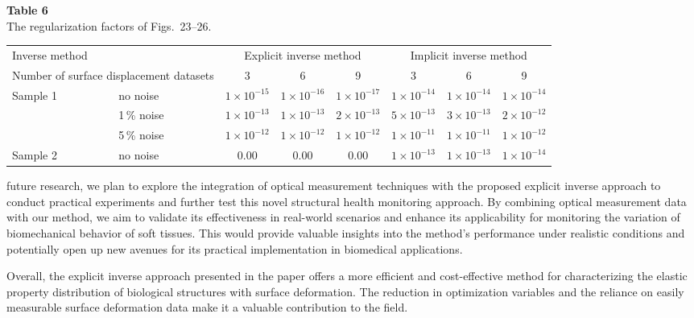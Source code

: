 \documentclass[11pt]{article}
\begin{document}
\noindent\textbf{Table 6}\\[0.2em]
{\small The regularization factors of Figs.~23--26.}
\vspace{0.3em}

\begin{center}
\footnotesize
\begin{tabular}{@{}ll ccc ccc@{}}
\toprule
\multicolumn{2}{l}{Inverse method}
  & \multicolumn{3}{c}{Explicit inverse method}
  & \multicolumn{3}{c}{Implicit inverse method} \\
\cmidrule(lr){3-5}\cmidrule(lr){6-8}
\multicolumn{2}{l}{Number of surface displacement datasets}
  & 3 & 6 & 9 & 3 & 6 & 9 \\
\midrule
\multirow{3}{*}{Sample 1}
  & no noise    & $1\times 10^{-15}$ & $1\times 10^{-16}$ & $1\times 10^{-17}$ & $1\times 10^{-14}$ & $1\times 10^{-14}$ & $1\times 10^{-14}$ \\
  & 1\,\% noise & $1\times 10^{-13}$ & $1\times 10^{-13}$ & $2\times 10^{-13}$ & $5\times 10^{-13}$ & $3\times 10^{-13}$ & $2\times 10^{-12}$ \\
  & 5\,\% noise & $1\times 10^{-12}$ & $1\times 10^{-12}$ & $1\times 10^{-12}$ & $1\times 10^{-11}$ & $1\times 10^{-11}$ & $1\times 10^{-12}$ \\
\midrule
Sample 2 & no noise & 0.00 & 0.00 & 0.00 & $1\times 10^{-13}$ & $1\times 10^{-13}$ & $1\times 10^{-14}$ \\
\bottomrule
\end{tabular}
\end{center}

\vspace{1em}

\noindent
future research, we plan to explore the integration of optical
measurement techniques with the proposed explicit inverse
approach to conduct practical experiments and further test this
novel structural health monitoring approach. By combining
optical measurement data with our method, we aim to validate
its effectiveness in real-world scenarios and enhance its
applicability for monitoring the variation of biomechanical
behavior of soft tissues. This would provide valuable insights
into the method's performance under realistic conditions and
potentially open up new avenues for its practical implementation
in biomedical applications.

Overall, the explicit inverse approach presented in the paper
offers a more efficient and cost-effective method for
characterizing the elastic property distribution of biological
structures with surface deformation. The reduction in
optimization variables and the reliance on easily measurable
surface deformation data make it a valuable contribution to the
field.
\end{document}
